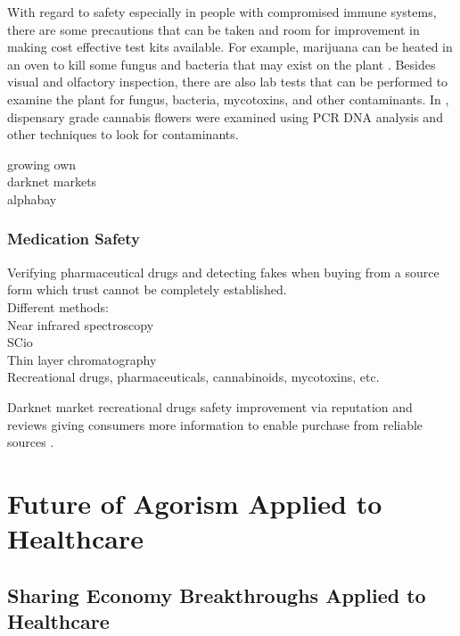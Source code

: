 \documentclass{article}
\begin{document}
With regard to safety especially in people with compromised immune systems, there are some precautions that can be taken and room for improvement in making cost effective test kits available. For example, marijuana can be heated in an oven to kill some fungus and bacteria that may exist on the plant \cite{russo2014handbook}. Besides visual and olfactory inspection, there are also lab tests that can be performed to examine the plant for fungus, bacteria, mycotoxins, and other contaminants. In \cite{mckernan2015cannabis}, dispensary grade cannabis flowers were examined using PCR DNA analysis and other techniques to look for contaminants. 

growing own\\
darknet markets\\
alphabay\\

\subsubsection{Medication Safety}

Verifying pharmaceutical drugs and detecting fakes when buying from a source form which trust cannot be completely established.\\

Different methods:\\
Near infrared spectroscopy\\
SCio\\

Thin layer chromatography\\ %
Recreational drugs\cite{jurek2016}, pharmaceuticals, cannabinoids, mycotoxins, etc.


Darknet market recreational drugs safety improvement via reputation and reviews giving consumers more information to enable purchase from reliable sources \cite{redman2016}.


\section{Future of Agorism Applied to Healthcare}

\subsection{Sharing Economy Breakthroughs Applied to Healthcare}
\end{document}
